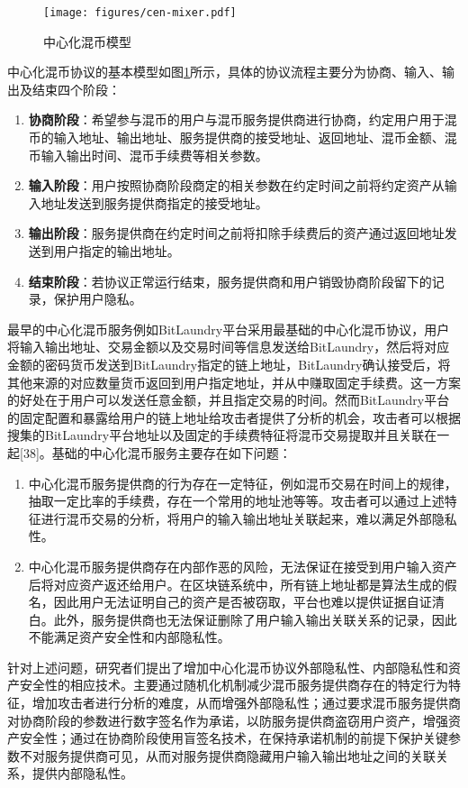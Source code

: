 \begin{figure}
\centering
\texttt{[image: figures/cen-mixer.pdf]}
\caption{中心化混币模型}
\label{fig:cen-mixer}
\end{figure}

中心化混币协议的基本模型如图\ref{fig:cen-mixer}所示，具体的协议流程主要分为协商、输入、输出及结束四个阶段：

\begin{enumerate}
	\item \textbf{协商阶段}：希望参与混币的用户与混币服务提供商进行协商，约定用户用于混币的输入地址、输出地址、服务提供商的接受地址、返回地址、混币金额、混币输入输出时间、混币手续费等相关参数。
	\item \textbf{输入阶段}：用户按照协商阶段商定的相关参数在约定时间之前将约定资产从输入地址发送到服务提供商指定的接受地址。
	\item \textbf{输出阶段}：服务提供商在约定时间之前将扣除手续费后的资产通过返回地址发送到用户指定的输出地址。
	\item \textbf{结束阶段}：若协议正常运行结束，服务提供商和用户销毁协商阶段留下的记录，保护用户隐私。
\end{enumerate}

最早的中心化混币服务例如BitLaundry平台采用最基础的中心化混币协议，用户将输入输出地址、交易金额以及交易时间等信息发送给BitLaundry，然后将对应金额的密码货币发送到BitLaundry指定的链上地址，BitLaundry确认接受后，将其他来源的对应数量货币返回到用户指定地址，并从中赚取固定手续费。这一方案的好处在于用户可以发送任意金额，并且指定交易的时间。然而BitLaundry平台的固定配置和暴露给用户的链上地址给攻击者提供了分析的机会，攻击者可以根据搜集的BitLaundry平台地址以及固定的手续费特征将混币交易提取并且关联在一起[38]。基础的中心化混币服务主要存在如下问题：

\begin{enumerate}
	\item 中心化混币服务提供商的行为存在一定特征，例如混币交易在时间上的规律，抽取一定比率的手续费，存在一个常用的地址池等等。攻击者可以通过上述特征进行混币交易的分析，将用户的输入输出地址关联起来，难以满足外部隐私性。
	\item 中心化混币服务提供商存在内部作恶的风险，无法保证在接受到用户输入资产后将对应资产返还给用户。在区块链系统中，所有链上地址都是算法生成的假名，因此用户无法证明自己的资产是否被窃取，平台也难以提供证据自证清白。此外，服务提供商也无法保证删除了用户输入输出关联关系的记录，因此不能满足资产安全性和内部隐私性。
\end{enumerate}
	
针对上述问题，研究者们提出了增加中心化混币协议外部隐私性、内部隐私性和资产安全性的相应技术。主要通过随机化机制减少混币服务提供商存在的特定行为特征，增加攻击者进行分析的难度，从而增强外部隐私性；通过要求混币服务提供商对协商阶段的参数进行数字签名作为承诺，以防服务提供商盗窃用户资产，增强资产安全性；通过在协商阶段使用盲签名技术，在保持承诺机制的前提下保护关键参数不对服务提供商可见，从而对服务提供商隐藏用户输入输出地址之间的关联关系，提供内部隐私性。

